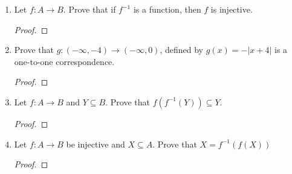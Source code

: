 \documentclass[11pt]{article}
\begin{document}
\begin{enumerate}
    \item Let $f:A\xrightarrow{} B$. Prove that if $f^{-1}$ is a function, then $f$ is injective.
        \begin{proof}
        \end{proof}
        
    \item Prove that $g:(-\infty, -4)\rightarrow(-\infty,0)$, defined by $g(x) = -|x+4|$ is a one-to-one correspondence.
        \begin{proof}
        \end{proof}
        
    \item Let $f:A \rightarrow B$ and $Y \subseteq B.$ Prove that $f(f^{-1}(Y)) \subseteq Y.$
        \begin{proof}
        \end{proof}
        
    \item Let $f:A \rightarrow B$ be injective and $X \subseteq A.$ \newline Prove that $X = f^{-1}(f(X))$ 
        \begin{proof}
        \end{proof}
    
\end{enumerate}
\end{document}
